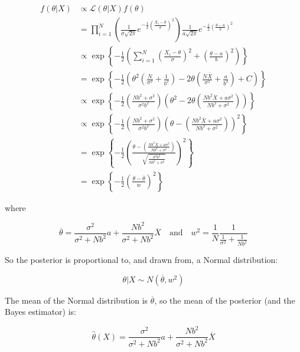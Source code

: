 \begin{align*}
f(\theta | X) &\propto \mathcal{L}(\theta | X) f(\theta) \\
&= \prod_{i = 1}^N \left( \frac{1}{\sigma \sqrt{2 \pi}} e^{-\frac{1}{2} \left(\frac{X_{i} - \theta}{\sigma} \right)^{2}} \right) \frac{1}{a \sqrt{2 \pi}} e^{-\frac{1}{2} \left( \frac{\theta - a}{b}\right)^{2}} \\
& \propto \exp \left\{ -\frac{1}{2} \left( \sum_{i=1}^N \left( \frac{X_{i} - \theta}{\sigma}\right)^{2} + \left( \frac{\theta - a}{b}\right)^{2} \right) \right\} \\
& = \exp \left\{-\frac{1}{2} \left( \theta^{2} \left(\frac{N}{\sigma^{2}} + \frac{1}{b^{2}} \right) - 2 \theta \left( \frac{N \overline{X}}{\sigma^{2}} + \frac{a}{b^{2}} \right) + C\right) \right\} \\
& \propto \exp \left\{-\frac{1}{2} \left( \frac{Nb^{2} + \sigma^{2}}{\sigma^{2} b^{2}} \right)\left(\theta^{2} - 2\theta \left(\frac{N b^{2} \overline{X} + a \sigma^{2}}{N b^{2} + \sigma^{2}} \right) \right) \right\} \\
& \propto \exp \left\{-\frac{1}{2} \left( \frac{Nb^{2} + \sigma^{2}}{\sigma^{2} b^{2}} \right) \left(\theta - \left(\frac{N b^{2} \overline{X} + a \sigma^{2}}{N b^{2} + \sigma^{2}} \right) \right)^{2} \right\} \\
& = \exp \left\{-\frac{1}{2} \left(\frac{\theta - \left(\frac{N b^{2} \overline{X} + a \sigma^{2}}{N b^{2} + \sigma^{2}} \right)}{\sqrt{\frac{\sigma^{2} b^{2}}{Nb^{2} + \sigma^{2}}}} \right)^{2} \right\} \\
& = \exp \left\{-\frac{1}{2} \left(\frac{\theta - \overline{\theta}}{w} \right)^{2} \right\}
\end{align*}

where

\[
\overline{\theta} = \frac{\sigma^{2}}{\sigma^{2} + N b^{2}}a + \frac{Nb^{2}}{\sigma^{2} + Nb^{2}}\overline{X}
\quad \text{and} \quad
w^{2} = \frac{1}{N} \frac{1}{\frac{1}{\sigma^{2}} + \frac{1}{Nb^{2}}}
\]

So the posterior is proportional to, and drawn from, a Normal
distribution:

\[ \theta | X \sim N(\overline{\theta}, w^{2}) \]

The mean of the Normal distribution is \(\overline{\theta}\), so the
mean of the posterior (and the Bayes estimator) is:

\[ \hat{\theta}(X) = \frac{\sigma^{2}}{\sigma^{2} + N b^{2}}a + \frac{Nb^{2}}{\sigma^{2} + Nb^{2}}\overline{X}\]

